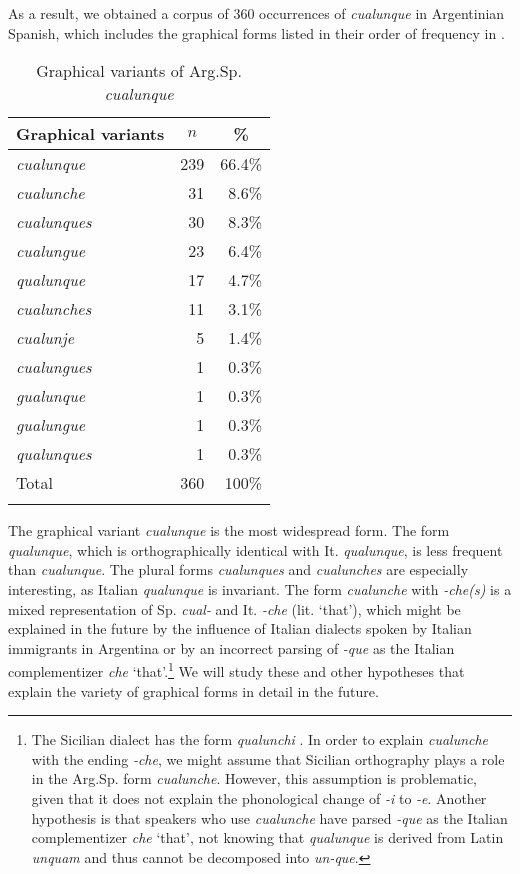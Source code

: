 \documentclass[output=paper,colorlinks,citecolor=brown]{langscibook}
\begin{document}
As a result, we obtained a corpus of 360 occurrences of \textit{cualunque} in Argentinian Spanish, which includes the graphical forms listed in their order of frequency in  . 

\begin{table}
\begin{tabular}{lrr}
\lsptoprule
Graphical variants  & \multicolumn{1}{c}{$n$} & \multicolumn{1}{c}{\%} \\
    \midrule
    \textit{cualunque} & 239 & 66.4\% \\
    \textit{cualunche}   & 31 & 8.6\% \\
    \textit{cualunques}  & 30 & 8.3\% \\
    \textit{cualungue}   & 23 & 6.4\% \\
    \textit{qualunque}   & 17 & 4.7\% \\
    \textit{cualunches}  & 11 & 3.1\% \\
    \textit{cualunje}     & 5 & 1.4\% \\
    \textit{cualungues}   & 1 & 0.3\% \\
    \textit{gualunque}    & 1 & 0.3\% \\
    \textit{gualungue}    & 1 & 0.3\% \\
    \textit{qualunques}   & 1 & 0.3\% \\
    \midrule
    Total  & 360 & 100\% \\
\lspbottomrule
\end{tabular}
\caption{Graphical variants of Arg.Sp. \textit{cualunque}}
\label{tab:fk1}
\end{table}

\noindent The graphical variant \textit{cualunque} is the most widespread form. The form \textit{qualunque}, which is orthographically identical with It. \textit{qualunque}, is less frequent than \textit{cualunque}. The plural forms \textit{cualunques} and \textit{cualunches} are especially interesting, as Italian \textit{qualunque} is invariant. The form \textit{cualunche} with \textit{-che(s)} is a mixed representation of Sp. \textit{cual-} and It. \textit{-che} (lit. ‘that’), which might be explained in the future by the influence of Italian dialects spoken by Italian immigrants in Argentina or by an incorrect parsing of \textit{-que} as the Italian complementizer \textit{che} ‘that’.{\footnote{The Sicilian dialect has the form \textit{qualunchi}  \citep[see][1041]{PiccittoTropea1990}. In order to explain \textit{cualunche} with the ending \textit{-che}, we might assume that Sicilian orthography plays a role in the Arg.Sp. form \textit{cualunche}. However, this assumption is problematic, given that it does not explain the phonological change of \textit{-i} to \textit{-e}. Another hypothesis is that speakers who use \textit{cualunche} have parsed \textit{-que} as the Italian complementizer \textit{che} ‘that’, not knowing that \textit{qualunque} is derived from Latin \textit{unquam} and thus cannot be decomposed into \textit{un-que}.}}  We will study these and other hypotheses that explain the variety of graphical forms in detail in the future.
\end{document}
